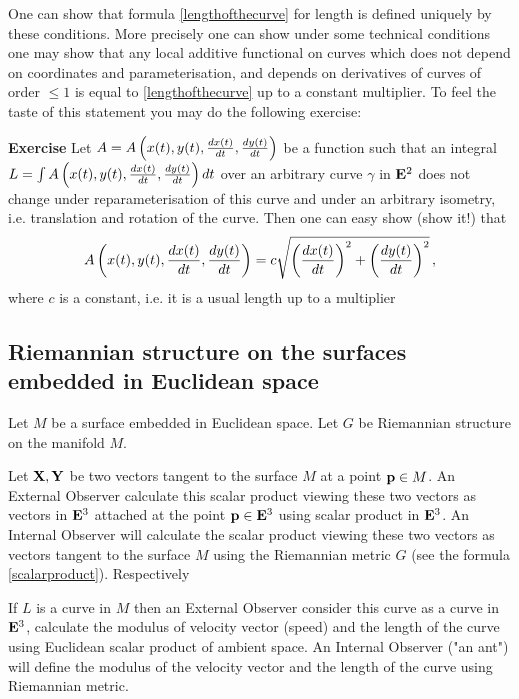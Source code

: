 \documentclass[12pt]{article}
\theoremstyle{theorem}
\numberwithin{equation}{section}
\begin{document}
{\footnotesize One can show that formula \eqref{lengthofthecurve}
for length is defined
uniquely by these conditions.
More precisely one can show under some technical conditions
one may show that any local additive functional on curves which does not
depend on coordinates and parameterisation, and depends on
derivatives of curves of order $\leq 1$  is equal
to \eqref{lengthofthecurve} up to a constant multiplier. To feel the taste of this statement
you may do the following exercise:

 {\bf Exercise} Let
$A=A\left(x(t), y(t),
 {dx(t)\over dt},{dy(t)\over dt}\right)$ be a function such that
an integral $L=\int A\left(x(t), y(t),
  {dx(t)\over dt},{dy(t)\over dt}\right)dt$ over an arbitrary curve
$\gamma$
in ${\bf E}^2$ does not change
under reparameterisation of this curve and under an arbitrary isometry,
i.e. translation and rotation of the curve.
Then one can easy show (show it!) that
        $$
   A\left(x(t), y(t),
 {dx(t)\over dt},{dy(t)\over dt}\right)=
  c\sqrt {\left({dx(t)\over dt}\right)^2+
   \left({dy(t)\over dt}\right)^2}\,,
    $$
where $c$ is a constant, i.e. it is a usual length up to a multiplier
}



\subsection{Riemannian structure on the surfaces embedded in Euclidean space}


Let $M$ be a surface embedded in Euclidean space. Let $G$ be Riemannian structure on the manifold $M$.

  Let ${\bf X}, {\bf Y}$ be two vectors tangent to the surface
$M$ at a point ${\bf p}\in M$. An External Observer calculate this scalar product viewing
these two vectors as vectors in ${\bf E}^3$ attached at the point ${\bf p}\in {\bf E}^3$
using scalar product in   ${\bf E}^3$.  An Internal Observer will calculate the scalar product
viewing these two vectors as vectors  tangent to the surface $M$
using the Riemannian
metric $G$ (see the formula \eqref{scalarproduct}).  Respectively


If $L$ is a curve in $M$ then an External Observer consider this curve as a curve in ${\bf E}^3$,
calculate the modulus of velocity  vector (speed) and the length of the curve using Euclidean scalar
product of ambient space. An Internal Observer ("an ant") will define the modulus of the velocity vector and
the length of the curve using Riemannian metric.
\end{document}
